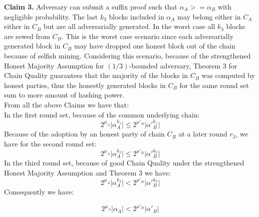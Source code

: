 \textbf{Claim 3.} Adversary can submit a suffix proof such that $\alpha_A >= \alpha_B$ with negligible probability.
The last $k_3$ blocks included in $\alpha_A$ may belong either in $C_A$ either in $C_B$ but are all adversarially generated. In the worst case  all $k_3 $ blocks are sewed from $C_B$. This is the worst case scenario since each adversarially generated block in $C_B$ may have dropped one honest block out of the chain because of selfish mining. Considering this scenario, because of the strengthened Honest Majority Assumption for $(1/3)$-bounded adversary, Theorem 3 for Chain Quality guarantees that the majority of the blocks in $C_B$ was computed by honest parties, thus the honestly generated blocks in $C_B$ for the same round set sum to more amount of hashing power.\\
From all the above Claims we have that:\\
In the first round set, because of the common underlying chain:
\begin{equation} \label{eq_v_round_set_1}
2^{\mu_A} \vert \alpha_A^{k_1} \vert \leq 2^{\mu'_B} \vert \alpha'{_B^{k_1}} \vert
\end{equation}
Because of the adoption by an honest party of chain $C_B$ at a later round $r_3$, we have for the second round set:
\begin{equation} \label{eq_v_round_set_2}
2^{\mu_A} \vert \alpha_A^{k_2} \vert \leq 2^{\mu'_B} \vert \alpha'{_B^{k_2}} \vert
\end{equation}
In the third round set, because of good Chain Quality under the strengthened Honest Majority Assumption and Theorem 3 we have:
\begin{equation} \label{eq_v_round_set_3}
2^{\mu_A} \vert \alpha_A^{k_3} \vert < 2^{\mu'_B} \vert \alpha'{_B^{k_3}} \vert
\end{equation}
Consequently we have:

\begin{equation} \label{eq_v_all_round_sets}
2^{\mu_A} \vert \alpha_A \vert < 2^{\mu'_B} \vert \alpha'{_B} \vert
\end{equation}

